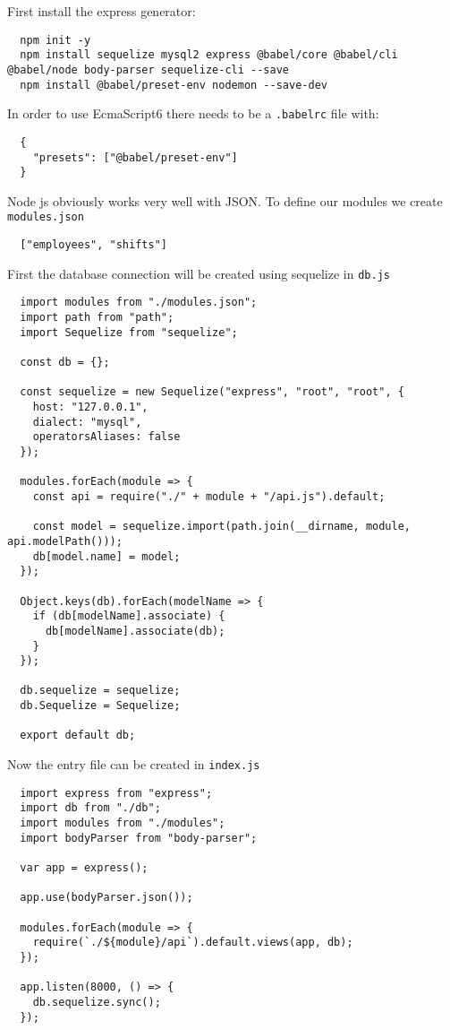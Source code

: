 First install the express generator:
\begin{verbatim}
  npm init -y
  npm install sequelize mysql2 express @babel/core @babel/cli @babel/node body-parser sequelize-cli --save
  npm install @babel/preset-env nodemon --save-dev
\end{verbatim}

In order to use EcmaScript6 there needs to be a \texttt{.babelrc} file with:
\begin{verbatim}
  {
    "presets": ["@babel/preset-env"]
  }
\end{verbatim}

Node js obviously works very well with JSON. To define our modules we create \texttt{modules.json}
\begin{verbatim}
  ["employees", "shifts"]
\end{verbatim}

First the database connection will be created using sequelize in \texttt{db.js}
\begin{verbatim}
  import modules from "./modules.json";
  import path from "path";
  import Sequelize from "sequelize";

  const db = {};

  const sequelize = new Sequelize("express", "root", "root", {
    host: "127.0.0.1",
    dialect: "mysql",
    operatorsAliases: false
  });

  modules.forEach(module => {
    const api = require("./" + module + "/api.js").default;

    const model = sequelize.import(path.join(__dirname, module, api.modelPath()));
    db[model.name] = model;
  });

  Object.keys(db).forEach(modelName => {
    if (db[modelName].associate) {
      db[modelName].associate(db);
    }
  });

  db.sequelize = sequelize;
  db.Sequelize = Sequelize;

  export default db;
\end{verbatim}

Now the entry file can be created in \texttt{index.js}
\begin{verbatim}
  import express from "express";
  import db from "./db";
  import modules from "./modules";
  import bodyParser from "body-parser";

  var app = express();

  app.use(bodyParser.json());

  modules.forEach(module => {
    require(`./${module}/api`).default.views(app, db);
  });

  app.listen(8000, () => {
    db.sequelize.sync();
  });
\end{verbatim}

